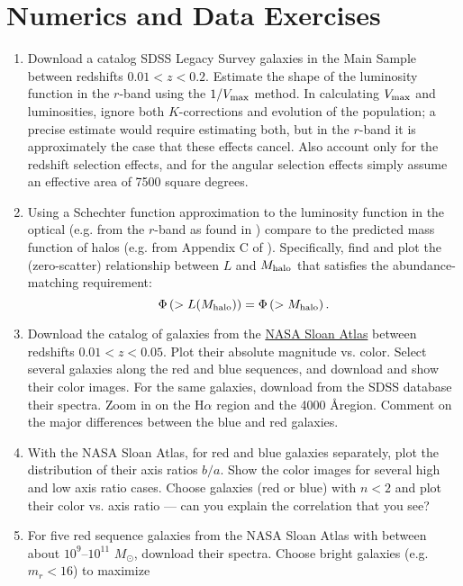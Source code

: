 \section{Numerics and Data Exercises}

\begin{enumerate}
\item Download a catalog SDSS Legacy Survey galaxies in the Main
Sample between redshifts $0.01 < z < 0.2$. Estimate the shape of the
luminosity function in the $r$-band using the $1/V_{\rm max}$
method. In calculating $V_{\rm max}$ and luminosities, ignore both
$K$-corrections and evolution of the population; a precise estimate
would require estimating both, but in the $r$-band it is approximately
the case that these effects cancel. Also account only for the redshift
selection effects, and for the angular selection effects simply assume
an effective area of 7500 square degrees.
\item Using a Schechter function approximation to the luminosity
function in the optical (e.g. from the $r$-band as found
in \citet{blanton03c}) compare to the predicted mass function of halos
(e.g. from Appendix C of \citealt{tinker08a}). Specifically, find and
plot the (zero-scatter) relationship between $L$ and $M_{\rm halo}$
that satisfies the abundance-matching requirement:
\begin{equation}
\Phi\left(>L(M_{\rm halo})\right) = \Phi\left(>M_{\rm halo}\right).
\end{equation}
\item Download the catalog of galaxies from
the \href{http://nsatlas.org}{NASA Sloan Atlas} between redshifts
$0.01 < z <0.05$. Plot their absolute magnitude vs. color. Select
several galaxies along the red and blue sequences, and download and
show their color images. For the same galaxies, download from the SDSS
database their spectra. Zoom in on the H$\alpha$ region and the
4000 \AA region. Comment on the major differences between the blue and
red galaxies.
\item With the NASA Sloan Atlas, for red and blue galaxies separately, plot the
distribution of their axis ratios $b/a$. Show the color images for
several high and low axis ratio cases. Choose galaxies (red or blue)
with $n<2$ and plot their color vs. axis ratio --- can you explain the
correlation that you see?
\item For five red sequence galaxies from the NASA Sloan Atlas with
between about $10^9$--$10^{11}$ $M_\odot$, download their
spectra. Choose bright galaxies (e.g. $m_r < 16$) to maximize

\end{enumerate}
